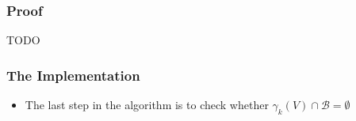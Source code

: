 \documentclass{beamer}
\begin{document}
{        \begin{frame}
            \frametitle{Proof}
            TODO
        \end{frame}

        \begin{frame}
            \frametitle{The Implementation}
            \begin{itemize}
                \item The last step in the algorithm is to check whether $\gamma_{k}(V) \cap \mathcal{B} = \emptyset$
            \end{itemize}
        \end{frame}
    }

            

            
            
            
            
            
            
\end{document}
